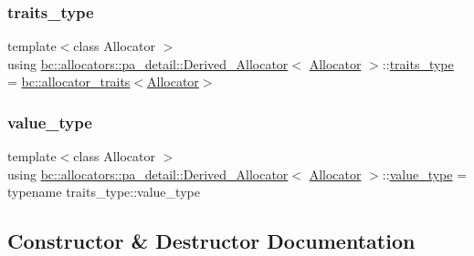 \subsubsection{\texorpdfstring{traits\+\_\+type}{traits\_type}}
{\footnotesize\ttfamily template$<$class Allocator $>$ \\
using \hyperlink{structbc_1_1allocators_1_1pa__detail_1_1Derived__Allocator}{bc\+::allocators\+::pa\+\_\+detail\+::\+Derived\+\_\+\+Allocator}$<$ \hyperlink{classbc_1_1allocators_1_1Allocator}{Allocator} $>$\+::\hyperlink{structbc_1_1allocators_1_1pa__detail_1_1Derived__Allocator_a99adbba950946cb42cb6f2ad3e18d9ca}{traits\+\_\+type} =  \hyperlink{structbc_1_1allocators_1_1allocator__traits}{bc\+::allocator\+\_\+traits}$<$\hyperlink{classbc_1_1allocators_1_1Allocator}{Allocator}$>$}

\mbox{\label{structbc_1_1allocators_1_1pa__detail_1_1Derived__Allocator_a997c60e64ca7028da4c9eb15b5bf553d}} 
\subsubsection{\texorpdfstring{value\+\_\+type}{value\_type}}
{\footnotesize\ttfamily template$<$class Allocator $>$ \\
using \hyperlink{structbc_1_1allocators_1_1pa__detail_1_1Derived__Allocator}{bc\+::allocators\+::pa\+\_\+detail\+::\+Derived\+\_\+\+Allocator}$<$ \hyperlink{classbc_1_1allocators_1_1Allocator}{Allocator} $>$\+::\hyperlink{structbc_1_1allocators_1_1pa__detail_1_1Derived__Allocator_a997c60e64ca7028da4c9eb15b5bf553d}{value\+\_\+type} =  typename traits\+\_\+type\+::value\+\_\+type}



\subsection{Constructor \& Destructor Documentation}
\mbox{\label{structbc_1_1allocators_1_1pa__detail_1_1Derived__Allocator_ae9f01e2b16db4fc2fec9e69947659bb9}} 
